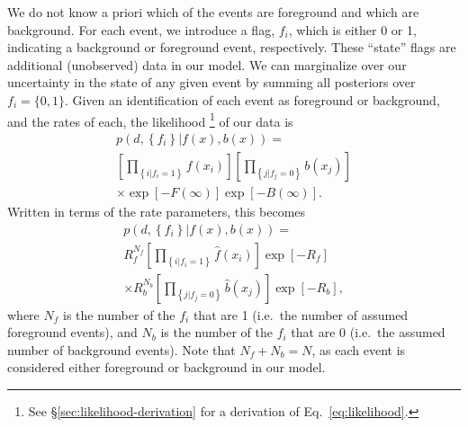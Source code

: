 \documentclass[aps,prd,reprint]{revtex4-1}
\begin{document}
We do not know a priori which of the events are foreground and which
are background.  For each event, we introduce a flag, $f_i$, which is
either 0 or 1, indicating a background or foreground event,
respectively.  These ``state'' flags are additional (unobserved) data
in our model.  We can marginalize over our uncertainty in the state of
any given event by summing all posteriors over $f_i = \{0,1\}$.  Given
an identification of each event as foreground or background, and the
rates of each, the likelihood%
\footnote{See \S \ref{sec:likelihood-derivation} for a derivation of
  Eq.~\eqref{eq:likelihood}.} %
of our data is
\begin{multline}
  \label{eq:likelihood}
  p\left( d, \left\{ f_i \right\} | f(x), b(x)
  \right) = \\ \left[ \prod_{\left\{ i | f_i = 1 \right\}} f\left( x_i
    \right) \right]  \left[ \prod_{\left\{ j | f_j = 0 \right\}}
    b\left( x_j \right) \right] \\
  \times \exp\left[ - F\left( \infty \right) \right] 
  \exp\left[ -B\left( \infty \right) \right].
\end{multline}
Written in terms of the rate parameters, this becomes
\begin{multline}
  \label{eq:likelihood-rates}
  p\left( d, \left\{ f_i \right\} | f(x), b(x)\right) = \\ R_f^{N_f}
  \left[ \prod_{\left\{ i | f_i = 1 \right\}}
    \hat{f}\left( x_i \right) \right] \exp\left[ - R_f \right] \\
  \times R_b^{N_b} \left[ \prod_{\left\{ j | f_j = 0 \right\}}
    \hat{b}\left( x_j \right) \right] \exp\left[ - R_b \right],
\end{multline}
where $N_f$ is the number of the $f_i$ that are 1 (i.e.\ the number of
assumed foreground events), and $N_b$ is the number of the $f_i$ that
are 0 (i.e.\ the assumed number of background events).  Note that $N_f
+ N_b = N$, as each event is considered either foreground or
background in our model.
\end{document}
